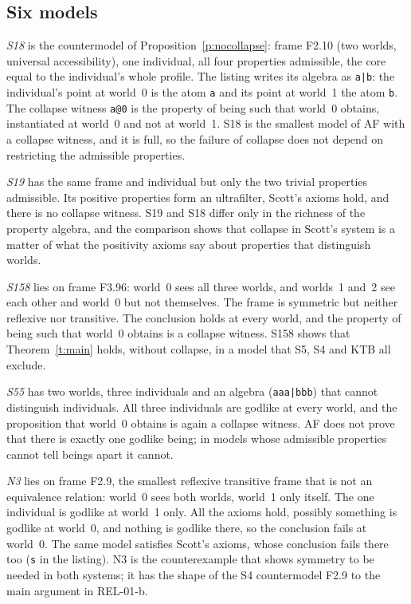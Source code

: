 \documentclass{situationist-preprint}
\begin{document}
\subsection{Six models}

\emph{S18} is the countermodel of Proposition~\ref{p:nocollapse}: frame F2.10 (two worlds, universal accessibility), one individual, all four properties admissible, the core equal to the individual's whole profile. The listing writes its algebra as \texttt{a|b}: the individual's point at world~0 is the atom \texttt{a} and its point at world~1 the atom \texttt{b}. The collapse witness \texttt{a@0} is the property of being such that world~0 obtains, instantiated at world~0 and not at world~1. S18 is the smallest model of AF with a collapse witness, and it is full, so the failure of collapse does not depend on restricting the admissible properties.

\emph{S19} has the same frame and individual but only the two trivial properties admissible. Its positive properties form an ultrafilter, Scott's axioms hold, and there is no collapse witness. S19 and S18 differ only in the richness of the property algebra, and the comparison shows that collapse in Scott's system is a matter of what the positivity axioms say about properties that distinguish worlds.

\emph{S158} lies on frame F3.96: world~0 sees all three worlds, and worlds~1 and~2 see each other and world~0 but not themselves. The frame is symmetric but neither reflexive nor transitive. The conclusion holds at every world, and the property of being such that world~0 obtains is a collapse witness. S158 shows that Theorem~\ref{t:main} holds, without collapse, in a model that S5, S4 and KTB all exclude.

\emph{S55} has two worlds, three individuals and an algebra (\texttt{aaa|bbb}) that cannot distinguish individuals. All three individuals are godlike at every world, and the proposition that world~0 obtains is again a collapse witness. AF does not prove that there is exactly one godlike being; in models whose admissible properties cannot tell beings apart it cannot.

\emph{N3} lies on frame F2.9, the smallest reflexive transitive frame that is not an equivalence relation: world~0 sees both worlds, world~1 only itself. The one individual is godlike at world~1 only. All the axioms hold, possibly something is godlike at world~0, and nothing is godlike there, so the conclusion fails at world~0. The same model satisfies Scott's axioms, whose conclusion fails there too (\texttt{s} in the listing). N3 is the counterexample that shows symmetry to be needed in both systems; it has the shape of the S4 countermodel F2.9 to the main argument in REL-01-b.
\end{document}
